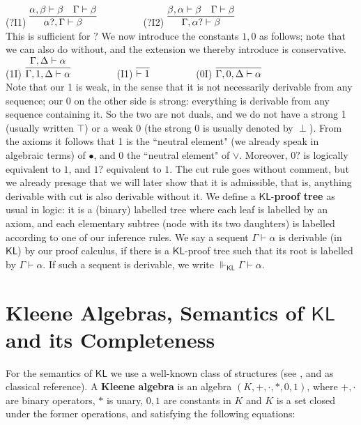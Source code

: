 \documentclass{eptcs}
\newcommand{\KL}{\mathsf{KL}}
\begin{document}
(?I1) $\infer{\alpha?,\Gamma\vdash\beta}
{\alpha,\beta\vdash\beta & \Gamma\vdash\beta}$
$\qquad\qquad$
(?I2) $\infer{\Gamma,\alpha?\vdash\beta}
{\beta,\alpha\vdash\beta & \Gamma\vdash\beta}$
\\

This is sufficient for $?$
We now introduce the constants $1,0$ as follows; note that we can also do
without, and the extension we thereby introduce is conservative.
\\

(1I) $\infer{\Gamma,1,\Delta\vdash\alpha}{\Gamma,\Delta\vdash\alpha}$
$\qquad\qquad$
(I1) $\infer{\vdash 1}{}$
$\qquad\qquad$
(0I) $\infer{\Gamma,0,\Delta\vdash\alpha}{}$
\\

Note that our 1 is weak, in the sense that it is not necessarily
derivable from any sequence; our 0 on the other side is strong:
everything is derivable from any sequence containing it.
So the two are not duals, and we do not have a strong 1 (usually 
written $\top$)
or a weak 0 (the strong 0 is usually denoted by $\perp$).
From the axioms it follows that 1 is the ``neutral element" 
(we already speak in algebraic terms) of $\bullet$, and
$0$ the ``neutral element" of $\vee$. Moreover, $0?$ is logically
equivalent to
$1$, and $1?$ equivalent to $1$. The cut rule goes without comment,
but we already presage that we will later show that it is admissible,
that is, anything derivable with cut is also derivable without it.
We define a $\KL$-\textbf{proof tree}
as usual in logic: it is a (binary) labelled tree where each leaf is
labelled by an axiom, and each elementary subtree (node with its
two daughters) is labelled according to one of our inference rules. 
We say a sequent $\Gamma\vdash\alpha$ is derivable (in $\KL$) by our
proof calculus, if there is a $\KL$-proof tree such that
its root is labelled by $\Gamma\vdash\alpha$.
If such a sequent is derivable, 
we write $\Vdash_{\KL}\Gamma\vdash\alpha$. 



\section{Kleene Algebras, Semantics of $\KL$ and its Completeness}

For the semantics of $\KL$ we use a well-known class of structures
(see \cite{kozen:kleene}, and \cite{conway:regular} as classical reference).
A \textbf{Kleene algebra} is an algebra $(K,+,\cdot,*,0,1)$, 
where $+,\cdot$ are binary operators, $*$ is unary, $0,1$ are
constants in $K$ and
$K$ is a set closed under the former
operations, and satisfying the following equations:
\\
\end{document}
